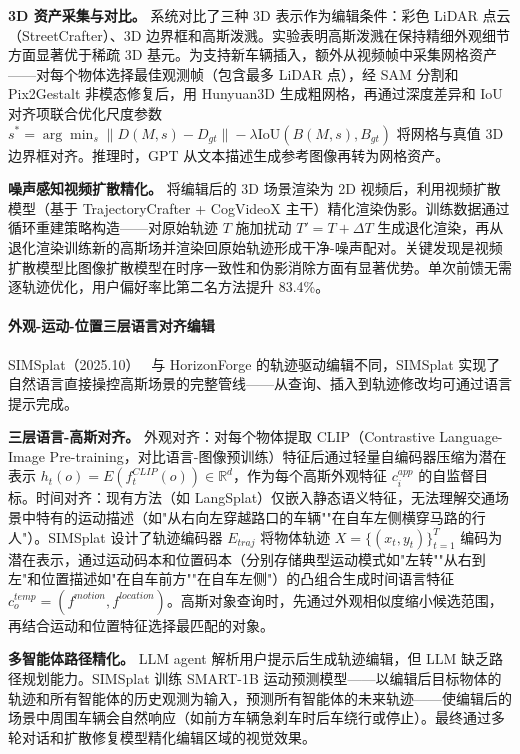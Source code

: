 \textbf{3D 资产采集与对比。} 系统对比了三种 3D 表示作为编辑条件：彩色 LiDAR 点云（StreetCrafter）、3D 边界框和高斯泼溅。实验表明高斯泼溅在保持精细外观细节方面显著优于稀疏 3D 基元。为支持新车辆插入，额外从视频帧中采集网格资产——对每个物体选择最佳观测帧（包含最多 LiDAR 点），经 SAM 分割和 Pix2Gestalt 非模态修复后，用 Hunyuan3D 生成粗网格，再通过深度差异和 IoU 对齐项联合优化尺度参数 $s^* = \arg\min_s \|D(M,s) - D_{gt}\| - \lambda \text{IoU}(B(M,s), B_{gt})$ 将网格与真值 3D 边界框对齐。推理时，GPT 从文本描述生成参考图像再转为网格资产。

\textbf{噪声感知视频扩散精化。} 将编辑后的 3D 场景渲染为 2D 视频后，利用视频扩散模型（基于 TrajectoryCrafter + CogVideoX 主干）精化渲染伪影。训练数据通过循环重建策略构造——对原始轨迹 $T$ 施加扰动 $T' = T + \Delta T$ 生成退化渲染，再从退化渲染训练新的高斯场并渲染回原始轨迹形成干净-噪声配对。关键发现是视频扩散模型比图像扩散模型在时序一致性和伪影消除方面有显著优势。单次前馈无需逐轨迹优化，用户偏好率比第二名方法提升 83.4\%。

\paragraph{外观-运动-位置三层语言对齐编辑}

SIMSplat（2025.10）~\cite{2510_02469} 与 HorizonForge 的轨迹驱动编辑不同，SIMSplat 实现了自然语言直接操控高斯场景的完整管线——从查询、插入到轨迹修改均可通过语言提示完成。

\textbf{三层语言-高斯对齐。} 外观对齐：对每个物体提取 CLIP（Contrastive Language-Image Pre-training，对比语言-图像预训练）特征后通过轻量自编码器压缩为潜在表示 $h_t(o) = E(f_t^{CLIP}(o)) \in \mathbb{R}^d$，作为每个高斯外观特征 $c_i^{app}$ 的自监督目标。时间对齐：现有方法（如 LangSplat）仅嵌入静态语义特征，无法理解交通场景中特有的运动描述（如"从右向左穿越路口的车辆""在自车左侧横穿马路的行人"）。SIMSplat 设计了轨迹编码器 $E_{traj}$ 将物体轨迹 $X = \{(x_t, y_t)\}_{t=1}^T$ 编码为潜在表示，通过运动码本和位置码本（分别存储典型运动模式如"左转""从右到左"和位置描述如"在自车前方""在自车左侧"）的凸组合生成时间语言特征 $c_o^{temp} = (f^{motion}, f^{location})$。高斯对象查询时，先通过外观相似度缩小候选范围，再结合运动和位置特征选择最匹配的对象。

\textbf{多智能体路径精化。} LLM agent 解析用户提示后生成轨迹编辑，但 LLM 缺乏路径规划能力。SIMSplat 训练 SMART-1B 运动预测模型——以编辑后目标物体的轨迹和所有智能体的历史观测为输入，预测所有智能体的未来轨迹——使编辑后的场景中周围车辆会自然响应（如前方车辆急刹车时后车绕行或停止）。最终通过多轮对话和扩散修复模型精化编辑区域的视觉效果。

